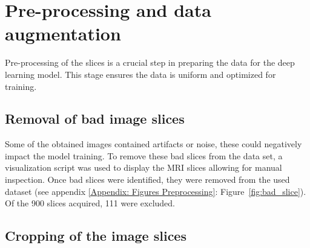 \documentclass[twocolumn]{article}
\begin{document}
\begin{table}[h]
\centering
\caption{\label{tab:mri} Overview of the scan and image parameters used to acquire high- and low-resolution data of mice.}
\end{table}


\section{Pre-processing and data augmentation}

Pre-processing of the slices is a crucial step in preparing the data for the deep learning model. 
This stage ensures the data is uniform and optimized for training. 

\subsection{Removal of bad image slices}

Some of the obtained images contained artifacts or noise, these could negatively impact the model training. 
To remove these bad slices from the data set, a visualization script was used to display the MRI slices allowing for manual inspection. 
Once bad slices were identified, they were removed from the used dataset (see appendix \ref{Appendix: Figures Preprocessing}: Figure~\ref{fig:bad_slice}). Of the 900 slices acquired, 111 were excluded.

\subsection{Cropping of the image slices}
\end{document}
